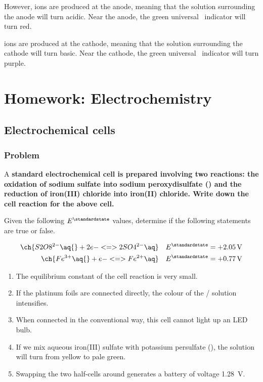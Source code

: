 However,  ions are produced at the anode, meaning that the solution surrounding
the anode will turn {\color{accent} acidic}. {\color{accent} Near the anode, the green universal
\pH\ indicator will turn red}.

 ions are produced at the cathode, meaning that the solution surrounding
the cathode will turn {\color{cobalt} basic}. {\color{cobalt} Near the cathode, the green universal \pH\ indicator will turn purple.}

\section{Homework: Electrochemistry}

\subsection{Electrochemical cells}
\subsubsection{Problem}
A \bf{standard} electrochemical cell is prepared involving two reactions: the
oxidation of sodium sulfate into sodium peroxydisulfate () and the
reduction of iron(III) chloride into iron(II) chloride. Write down the cell
reaction for the above cell.

Given the following \(E^\standardstate\) values, determine if the following
statements are true or false.

\begin{align*}
	\ch{S2O8^{2-} \aq{} + 2 e- <=> 2 SO4^{2-} \aq} & \quad E^\standardstate = +\qty{2.05}{\volt} \\
	\ch{Fe^{3+} \aq{} + e- <=> Fe^{2+} \aq}        & \quad E^\standardstate = +\qty{0.77}{\volt}
\end{align*}

\begin{enumerate}
	\item The equilibrium constant of the cell reaction is very small.
	\item If the platinum foils are connected directly, the colour of the / solution
	      intensifies.
	\item When connected in the conventional way, this cell cannot light up an LED bulb.
	\item If we mix aqueous iron(III) sulfate with potassium persulfate (), the solution will
	      turn from yellow to pale green.
	\item Swapping the two half-cells around generates a battery of voltage \qty{1.28}{\volt}.
\end{enumerate}

